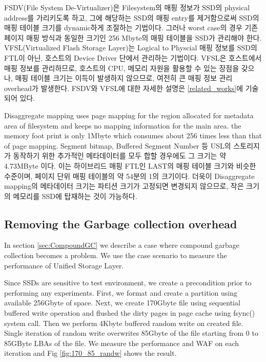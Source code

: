 \documentclass[letterpaper,twocolumn,10pt]{article}
\begin{document}
FSDV(File System De-Virtualizer\cite{zhangremoving})은 Filesystem의 매핑 정보가 SSD의 physical address를 가리키도록 하고, 그에 해당하는 SSD의 매핑 entry를 제거함으로써 SSD의 매핑 테이블 크기를 dynamic하게 조절하는 기법이다. 그러나 worst case의 경우 기존 페이지 매핑 방식과 동일한 크기인 256 Mbyte의 매핑 테이블을 SSD가 관리해야 한다. VFSL(Virtualized Flash Storage Layer\cite{josephson2010dfs})는 Logical to Physcial 매핑 정보를 SSD의 FTL이 아닌, 호스트의 Device Driver 단에서 관리하는 기법이다. VFSL은 호스트에서 매핑 정보를 관리하므로, 호스트의 CPU, 메모리 자원을 활용할 수 있는 장점을 갖으나, 매핑 테이블 크기는 이득이 발생하지 않으므로, 여전히 큰 매핑 정보 관리 overhead가 발생한다. FSDV와 VFSL에 대한 자세한 설명은 \ref{related_works}에 기술되어 있다.

Disaggregate mapping uses page mapping for the region allocated for metadata area of filesystem and keeps no mapping information for the main area. the memory foot print is only 1Mbyte which consumes about 256 times less than that of page mapping. Segment bitmap, Buffered Segment Number 등 USL의 스토리지가 동작하기 위한 추가적인 메타데이터를 모두 합할 경우에도 그 크기는 약 4.73MByte 이다. 이는 하이브리드 매핑 FTL인 LAST의 매핑 테이블 크기와 비슷한 수준이며, 페이지 단위 매핑 테이블의 약 54분의 1의 크기이다. 더욱이 Disaggregate mapping의 메타데이터 크기는 파티션 크기가 고정되면 변경되지 않으므로, 작은 크기의 메모리를 SSD에 탑재하는 것이 가능하다.



\subsection{Removing the Garbage collection overhead}

In section \ref{sec:CompoundGC} we describe a case where compound garbage collection becomes a problem. We use the case scenario to measure the performance of Unified Storage Layer.

Since SSDs are sensitive to test environment, we create a precondition prior to performing any experiments. First, we format and create a partition using available 256Gbyte of space. Next, we create 170Gbyte file using sequential buffered write operation and flushed the dirty pages in page cache using fsync() system call. Then we perform 4Kbyte buffered random write on created file. Single iteration of random write overwrites 85Gbyte of the file starting from 0 to 85GByte LBAs of the file. We measure the performance and WAF on each iteration and Fig \ref{fig:170_85_randw} shows the result. 
\end{document}
